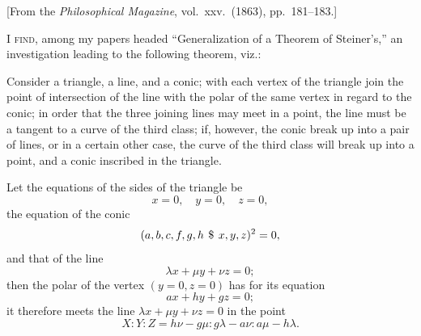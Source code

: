 \documentclass[11pt,a4paper]{article}
\theoremstyle{plain}
\begin{document}
[From the \textit{Philosophical Magazine}, vol.\ xxv.\ (1863), pp.\ 181--183.]

\medskip

I \textsc{find}, among my papers headed ``Generalization of a Theorem of Steiner's,'' an investigation leading to the following theorem, viz.:

Consider a triangle, a line, and a conic; with each vertex of the triangle join the point of intersection of the line with the polar of the same vertex in regard to the conic; in order that the three joining lines may meet in a point, the line must be a tangent to a curve of the third class; if, however, the conic break up into a pair of lines, or in a certain other case, the curve of the third class will break up into a point, and a conic inscribed in the triangle.

Let the equations of the sides of the triangle be
\[
x = 0, \quad y = 0, \quad z = 0,
\]
the equation of the conic
\[
(a, b, c, f, g, h \, \mathbin{\char`\$} \, x, y, z)^2 = 0,
\]
and that of the line
\[
\lambda x + \mu y + \nu z = 0;
\]
then the polar of the vertex $(y = 0, z = 0)$ has for its equation
\[
ax + hy + gz = 0;
\]
it therefore meets the line $\lambda x + \mu y + \nu z = 0$ in the point
\[
X : Y : Z = h\nu - g\mu : g\lambda - a\nu : a\mu - h\lambda.
\]
\end{document}
